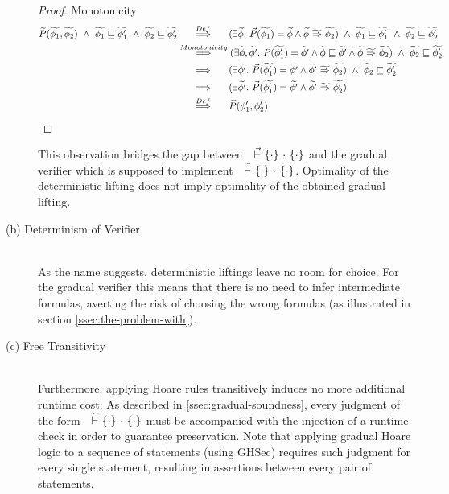 \begin{description}
\begin{proof}
        Monotonicity
        \begin{align*}
        \widetilde{P}(\widetilde{\phi_1}, \widetilde{\phi_2}) ~\wedge~ \widetilde{\phi_1} \sqsubseteq \widetilde{\phi_1'} ~\wedge~ \widetilde{\phi_2} \sqsubseteq \widetilde{\phi_2'}
        &\overset{Def}{~\quad\implies\quad~} (\exists \widetilde{\phi}.~ \vec{P}(\widetilde{\phi_1}) = \widetilde{\phi} \wedge {\widetilde{\phi}} \,\,{\widetilde{\Rightarrow}}\,\, {\widetilde{\phi_2}}) ~\wedge~ \widetilde{\phi_1} \sqsubseteq \widetilde{\phi_1'} ~\wedge~ \widetilde{\phi_2} \sqsubseteq \widetilde{\phi_2'}\\
        &\overset{Monotonicity}{~\quad\implies\quad~} (\exists \widetilde{\phi}, \widetilde{\phi'}.~ \vec{P}(\widetilde{\phi_1'}) = \widetilde{\phi'} \wedge \widetilde{\phi} \sqsubseteq \widetilde{\phi'} \wedge {\widetilde{\phi}} \,\,{\widetilde{\Rightarrow}}\,\, {\widetilde{\phi_2}}) ~\wedge~ \widetilde{\phi_2} \sqsubseteq \widetilde{\phi_2'}\\
        &\overset{}{~\quad\implies\quad~} (\exists \widetilde{\phi'}.~ \vec{P}(\widetilde{\phi_1'}) = \widetilde{\phi'} \wedge {\widetilde{\phi'}} \,\,{\widetilde{\Rightarrow}}\,\, {\widetilde{\phi_2}}) ~\wedge~ \widetilde{\phi_2} \sqsubseteq \widetilde{\phi_2'}\\
        &\overset{}{~\quad\implies\quad~} (\exists \widetilde{\phi'}.~ \vec{P}(\widetilde{\phi_1'}) = \widetilde{\phi'} \wedge {\widetilde{\phi'}} \,\,{\widetilde{\Rightarrow}}\,\, {\widetilde{\phi_2'}})\\
        &\overset{Def}{~\quad\implies\quad~} \widetilde{P}(\phi_1', \phi_2') \\
        \end{align*}
    \end{proof}
    
    This observation bridges the gap between ${~} \,\,\vec{\vdash}\,\, \{{\cdot}\} ~{\cdot}~ \{{\cdot}\}$ and the gradual verifier which is supposed to implement ${~} \,\,\widetilde{\vdash}\,\, \{{\cdot}\} ~{\cdot}~ \{{\cdot}\}$.
    Optimality of the deterministic lifting does not imply optimality of the obtained gradual lifting.
    
    \item[(b) Determinism of Verifier]~\\
    As the name suggests, deterministic liftings leave no room for choice.
    For the gradual verifier this means that there is no need to infer intermediate formulas, averting the risk of choosing the wrong formulas (as illustrated in section \ref{ssec:the-problem-with}).
    
    \item[(c) Free Transitivity]~\\
    Furthermore, applying Hoare rules transitively induces no more additional runtime cost:
    As described in \ref{ssec:gradual-soundness}, every judgment of the form ${~} \,\,\widetilde{\vdash}\,\, \{{\cdot}\} ~{\cdot}~ \{{\cdot}\}$ must be accompanied with the injection of a runtime check in order to guarantee preservation.
    Note that applying gradual Hoare logic to a sequence of statements (using GHSec) requires such judgment for every single statement, resulting in assertions between every pair of statements.
    

\end{description}
